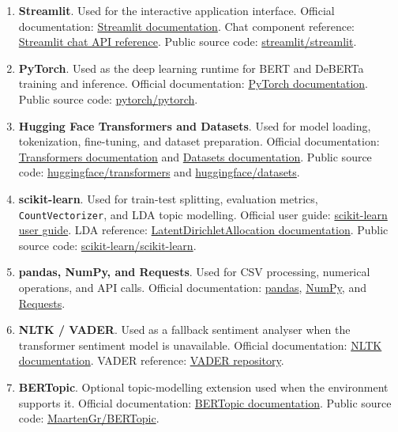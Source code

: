 \documentclass[11pt]{article}
\newcommand{\code}[1]{\texttt{#1}}
\begin{document}
\begin{enumerate}
    \item \textbf{Streamlit}. Used for the interactive application interface.
    Official documentation: \href{https://docs.streamlit.io/}{Streamlit documentation}. Chat component reference:
    \href{https://docs.streamlit.io/develop/api-reference/chat}{Streamlit chat API reference}. Public source code:
    \href{https://github.com/streamlit/streamlit}{streamlit/streamlit}.

    \item \textbf{PyTorch}. Used as the deep learning runtime for BERT and
    DeBERTa training and inference. Official documentation:
    \href{https://docs.pytorch.org/docs/stable/index.html}{PyTorch documentation}. Public source code:
    \href{https://github.com/pytorch/pytorch}{pytorch/pytorch}.

    \item \textbf{Hugging Face Transformers and Datasets}. Used for model
    loading, tokenization, fine-tuning, and dataset preparation. Official documentation:
    \href{https://huggingface.co/docs/transformers}{Transformers documentation} and
    \href{https://huggingface.co/docs/datasets}{Datasets documentation}. Public source code:
    \href{https://github.com/huggingface/transformers}{huggingface/transformers} and
    \href{https://github.com/huggingface/datasets}{huggingface/datasets}.

    \item \textbf{scikit-learn}. Used for train-test splitting, evaluation
    metrics, \code{CountVectorizer}, and LDA topic modelling. Official user guide:
    \href{https://scikit-learn.org/stable/user_guide.html}{scikit-learn user guide}. LDA reference:
    \href{https://scikit-learn.org/stable/modules/generated/sklearn.decomposition.LatentDirichletAllocation.html}{LatentDirichletAllocation documentation}. Public source code:
    \href{https://github.com/scikit-learn/scikit-learn}{scikit-learn/scikit-learn}.

    \item \textbf{pandas, NumPy, and Requests}. Used for CSV processing,
    numerical operations, and API calls. Official documentation:
    \href{https://pandas.pydata.org/pandas-docs/stable/}{pandas},
    \href{https://numpy.org/doc/stable/}{NumPy}, and
    \href{https://requests.readthedocs.io/}{Requests}.

    \item \textbf{NLTK / VADER}. Used as a fallback sentiment analyser when the
    transformer sentiment model is unavailable. Official documentation:
    \href{https://www.nltk.org/}{NLTK documentation}. VADER reference:
    \href{https://github.com/cjhutto/vaderSentiment}{VADER repository}.

    \item \textbf{BERTopic}. Optional topic-modelling extension used when the
    environment supports it. Official documentation:
    \href{https://maartengr.github.io/BERTopic/}{BERTopic documentation}. Public source code:
    \href{https://github.com/MaartenGr/BERTopic}{MaartenGr/BERTopic}.
\end{enumerate}
\end{document}
